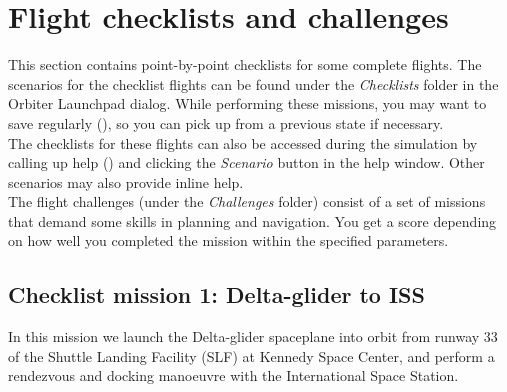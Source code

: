 \documentclass[Orbiter User Manual.tex]{subfiles}
\begin{document}
\section{Flight checklists and challenges}
\label{sec:checklists}
This section contains point-by-point checklists for some complete flights. The scenarios for the checklist flights can be found under the \textit{Checklists} folder in the Orbiter Launchpad dialog. While performing these missions, you may want to save regularly (\Ctrl{}), so you can pick up from a previous state if necessary.\\
The checklists for these flights can also be accessed during the simulation by calling up help (\Alt{}) and clicking the \textit{Scenario} button in the help window. Other scenarios may also provide inline help.\\
The flight challenges (under the \textit{Challenges} folder) consist of a set of missions that demand some skills in planning and navigation. You get a score depending on how well you completed the mission within the specified parameters.

\subsection{Checklist mission 1: Delta-glider to ISS}
\label{ssec:checklist_1}
In this mission we launch the Delta-glider spaceplane into orbit from runway 33 of the Shuttle Landing Facility (SLF) at Kennedy Space Center, and perform a rendezvous and docking manoeuvre with the International Space Station.
\end{document}
